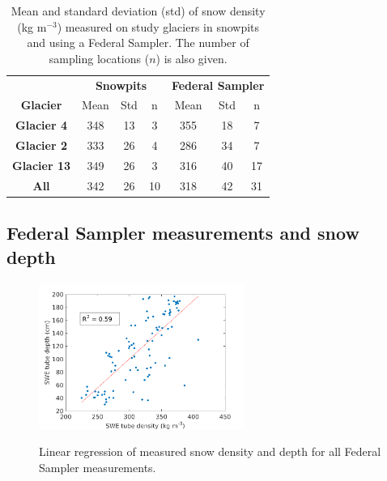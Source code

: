\documentclass[12pt]{article}
\begin{document}
\begin{table}[h!]
\centering
\caption{ Mean and standard deviation (std) of snow density (kg m$^{-3}$) measured on study glaciers in snowpits and using a Federal Sampler. The number of sampling locations ($n$) is also given.}
\label{tab:density_stats}
\begin{tabular}{c|ccc|ccc}
 & \multicolumn{3}{c}{\textbf{Snowpits}} & \multicolumn{3}{|c}{\textbf{Federal Sampler}} \\
\multirow{-2}{*}{\textbf{Glacier}} & Mean & Std & n & Mean & Std & n \\ \hline \hline
\textbf{Glacier 4} & 348 & 13 & 3 & 355 & 18 & 7 \\
\textbf{Glacier 2} & 333 & 26 & 4 & 286 & 34 & 7 \\
\textbf{Glacier 13} & 349 & 26 & 3 & 316 & 40 & 17 \\  \hline
\textbf{All} & 342 & 26 & 10 & 318 & 42 & 31
\end{tabular}
\end{table}

\subsection{Federal Sampler measurements and snow depth}

\begin{figure} 
	\centering
	\includegraphics[width =0.6\textwidth]{DepthDensity_SWEtube.png}\\
	\caption{Linear regression of measured snow density and depth for all Federal Sampler measurements.}
	\label{fig:tube_depth}
\end{figure}
\end{document}
